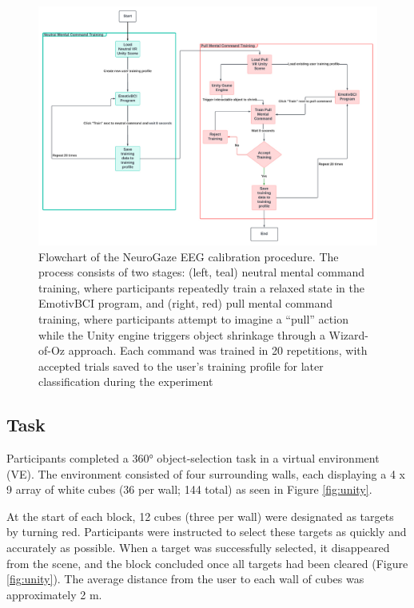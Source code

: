 \documentclass[utf8]{FrontiersinHarvard} %
\begin{document}
\begin{figure}[ht]
\begin{center}
\includegraphics[width=17cm]{figures/flowchart_for_training.jpg}
\end{center}
\caption{Flowchart of the NeuroGaze EEG calibration procedure. The process consists of two stages: (left, teal) neutral mental command training, where participants repeatedly train a relaxed state in the EmotivBCI program, and (right, red) pull mental command training, where participants attempt to imagine a “pull” action while the Unity engine triggers object shrinkage through a Wizard-of-Oz approach. Each command was trained in 20 repetitions, with accepted trials saved to the user's training profile for later classification during the experiment}\label{fig:training-flowchart}
\end{figure}

\subsection{Task}
Participants completed a 360° object-selection task in a virtual environment (VE). The environment consisted of four surrounding walls, each displaying a 4 x 9 array of white cubes (36 per wall; 144 total) as seen in Figure \ref{fig:unity}. 

At the start of each block, 12 cubes (three per wall) were designated as targets by turning red. Participants were instructed to select these targets as quickly and accurately as possible. When a target was successfully selected, it disappeared from the scene, and the block concluded once all targets had been cleared (Figure \ref{fig:unity}). The average distance from the user to each wall of cubes was approximately 2 m.
\end{document}
